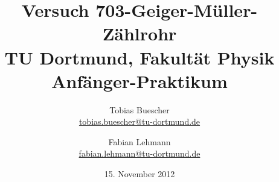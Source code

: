 

\renewcommand*\rmdefault{iwona}\normalfont\upshape


\title{Versuch 703-Geiger-Müller-Zählrohr\\				%
\large TU Dortmund, Fakultät Physik\\ 
\normalsize Anfänger-Praktikum}

\author{Tobias Buescher\\			%
{\small \href{tobias.buescher@tu-dortmund.de}{tobias.buescher@tu-dortmund.de}}	%
\and						%
Fabian Lehmann\\					%
{\small \href{fabian.lehmann@tu-dortmund.de}{fabian.lehmann@tu-dortmund.de}}		%
}
\date{15. November 2012}				%





\maketitle					%
\thispagestyle{empty} 				%


\newpage					%
\pagestyle{empty}				%

\tableofcontents


\newpage					%


